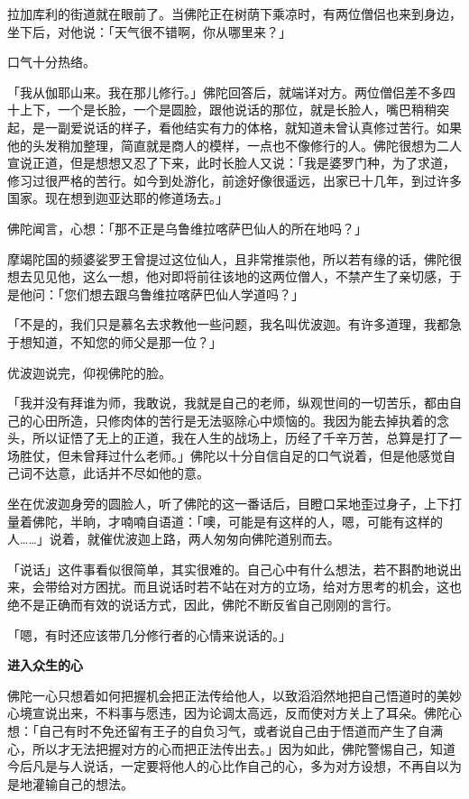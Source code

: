 \documentclass[twoside,openany]{book}
\newcommand{\mt}[1]{\textbullet \textbf{#1}}
\begin{document}
拉加库利的街道就在眼前了。当佛陀正在树荫下乘凉时，有两位僧侣也来到身边，坐下后，对他说：「天气很不错啊，你从哪里来？」

口气十分热络。

「我从伽耶山来。我在那儿修行。」佛陀回答后，就端详对方。两位僧侣差不多四十上下，一个是长脸，一个是圆脸，跟他说话的那位，就是长脸人，嘴巴稍稍突起，是一副爱说话的样子，看他结实有力的体格，就知道未曾认真修过苦行。如果他的头发稍加整理，简直就是商人的模样，一点也不像修行的人。佛陀很想为二人宣说正道，但是想想又忍了下来，此时长脸人又说：「我是婆罗门种，为了求道，修习过很严格的苦行。如今到处游化，前途好像很遥远，出家已十几年，到过许多国家。现在想到迦亚达耶的修道场去。」

佛陀闻言，心想：「那不正是乌鲁维拉喀萨巴仙人的所在地吗？」

摩竭陀国的频婆娑罗王曾提过这位仙人，且非常推崇他，所以若有缘的话，佛陀很想去见见他，这么一想，他对即将前往该地的这两位僧人，不禁产生了亲切感，于是他问：「您们想去跟乌鲁维拉喀萨巴仙人学道吗？」

「不是的，我们只是慕名去求教他一些问题，我名叫优波迦。有许多道理，我都急于想知道，不知您的师父是那一位？」

优波迦说完，仰视佛陀的脸。

「我并没有拜谁为师，我敢说，我就是自己的老师，纵观世间的一切苦乐，都由自己的心田所造，只修肉体的苦行是无法驱除心中烦恼的。我因为能去掉执着的念头，所以证悟了无上的正道，我在人生的战场上，历经了千辛万苦，总算是打了一场胜仗，但未曾拜过什么老师。」佛陀以十分自信自足的口气说着，但是他感觉自己词不达意，此话并不尽如他的意。

坐在优波迦身旁的圆脸人，听了佛陀的这一番话后，目瞪口呆地歪过身子，上下打量着佛陀，半晌，才喃喃自语道：「噢，可能是有这样的人，嗯，可能有这样的人……」说着，就催优波迦上路，两人匆匆向佛陀道别而去。

「说话」这件事看似很简单，其实很难的。自己心中有什么想法，若不斟酌地说出来，会带给对方困扰。而且说话时若不站在对方的立场，给对方思考的机会，这也绝不是正确而有效的说话方式，因此，佛陀不断反省自己刚刚的言行。

「嗯，有时还应该带几分修行者的心情来说话的。」

\mt{进入众生的心}

佛陀一心只想着如何把握机会把正法传给他人，以致滔滔然地把自己悟道时的美妙心境宣说出来，不料事与愿违，因为论调太高远，反而使对方关上了耳朵。佛陀心想：「自己有时不免还留有王子的自负习气，或者说自己由于悟道而产生了自满心，所以才无法把握对方的心而把正法传出去。」因为如此，佛陀警惕自己，知道今后凡是与人说话，一定要将他人的心比作自己的心，多为对方设想，不再自以为是地灌输自己的想法。
\end{document}
